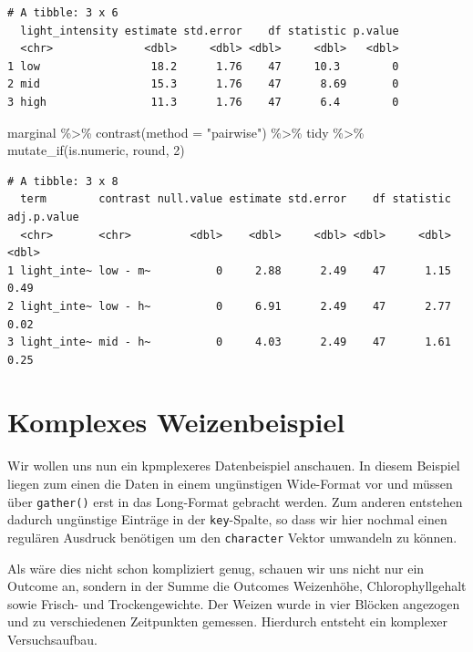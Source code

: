 \documentclass[
  letterpaper,
  DIV=11,
  oneside]{scrreport}
\newenvironment{Shaded}{\begin{snugshade}}{\end{snugshade}}
\newcommand{\AttributeTok}[1]{\textcolor[rgb]{0.40,0.45,0.13}{#1}}
\newcommand{\DecValTok}[1]{\textcolor[rgb]{0.68,0.00,0.00}{#1}}
\newcommand{\FunctionTok}[1]{\textcolor[rgb]{0.28,0.35,0.67}{#1}}
\newcommand{\NormalTok}[1]{\textcolor[rgb]{0.00,0.23,0.31}{#1}}
\newcommand{\SpecialCharTok}[1]{\textcolor[rgb]{0.37,0.37,0.37}{#1}}
\newcommand{\StringTok}[1]{\textcolor[rgb]{0.13,0.47,0.30}{#1}}
\begin{document}
\begin{verbatim}
# A tibble: 3 x 6
  light_intensity estimate std.error    df statistic p.value
  <chr>              <dbl>     <dbl> <dbl>     <dbl>   <dbl>
1 low                 18.2      1.76    47     10.3        0
2 mid                 15.3      1.76    47      8.69       0
3 high                11.3      1.76    47      6.4        0
\end{verbatim}

\begin{Shaded}
\begin{Highlighting}[]
\NormalTok{marginal }\SpecialCharTok{\%\textgreater{}\%} \FunctionTok{contrast}\NormalTok{(}\AttributeTok{method =} \StringTok{"pairwise"}\NormalTok{) }\SpecialCharTok{\%\textgreater{}\%}\NormalTok{ tidy }\SpecialCharTok{\%\textgreater{}\%} 
  \FunctionTok{mutate\_if}\NormalTok{(is.numeric, round, }\DecValTok{2}\NormalTok{)}
\end{Highlighting}
\end{Shaded}

\begin{verbatim}
# A tibble: 3 x 8
  term        contrast null.value estimate std.error    df statistic adj.p.value
  <chr>       <chr>         <dbl>    <dbl>     <dbl> <dbl>     <dbl>       <dbl>
1 light_inte~ low - m~          0     2.88      2.49    47      1.15        0.49
2 light_inte~ low - h~          0     6.91      2.49    47      2.77        0.02
3 light_inte~ mid - h~          0     4.03      2.49    47      1.61        0.25
\end{verbatim}

\hypertarget{komplexes-weizenbeispiel}{%
\section{Komplexes Weizenbeispiel}\label{komplexes-weizenbeispiel}}

Wir wollen uns nun ein kpmplexeres Datenbeispiel anschauen. In diesem
Beispiel liegen zum einen die Daten in einem ungünstigen Wide-Format vor
und müssen über \texttt{gather()} erst in das Long-Format gebracht
werden. Zum anderen entstehen dadurch ungünstige Einträge in der
\texttt{key}-Spalte, so dass wir hier nochmal einen regulären Ausdruck
benötigen um den \texttt{character} Vektor umwandeln zu können.

Als wäre dies nicht schon kompliziert genug, schauen wir uns nicht nur
ein Outcome an, sondern in der Summe die Outcomes Weizenhöhe,
Chlorophyllgehalt sowie Frisch- und Trockengewichte. Der Weizen wurde in
vier Blöcken angezogen und zu verschiedenen Zeitpunkten gemessen.
Hierdurch entsteht ein komplexer Versuchsaufbau.
\end{document}
